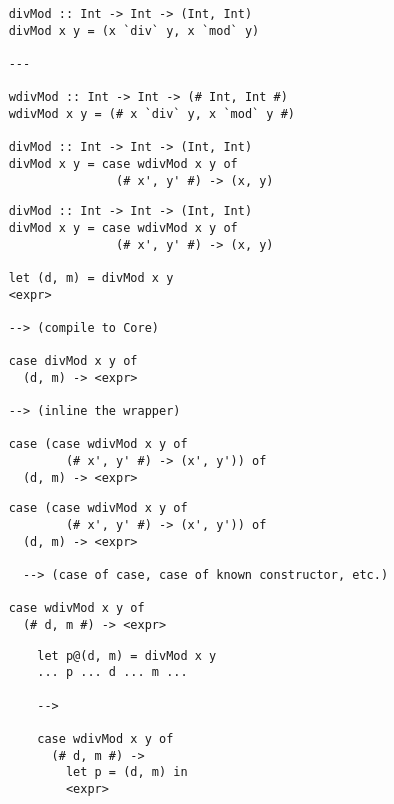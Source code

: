 \documentclass{beamer}
\begin{document}
\begin{frame}[fragile]
    \begin{verbatim}
    divMod :: Int -> Int -> (Int, Int)
    divMod x y = (x `div` y, x `mod` y)

    ---

    wdivMod :: Int -> Int -> (# Int, Int #)
    wdivMod x y = (# x `div` y, x `mod` y #)

    divMod :: Int -> Int -> (Int, Int)
    divMod x y = case wdivMod x y of
                   (# x', y' #) -> (x, y)
    \end{verbatim}
\end{frame}

\begin{frame}[fragile]
    \begin{verbatim}
    divMod :: Int -> Int -> (Int, Int)
    divMod x y = case wdivMod x y of
                   (# x', y' #) -> (x, y)

    let (d, m) = divMod x y
    <expr>

    --> (compile to Core)

    case divMod x y of
      (d, m) -> <expr>

    --> (inline the wrapper)

    case (case wdivMod x y of
            (# x', y' #) -> (x', y')) of
      (d, m) -> <expr>
    \end{verbatim}
\end{frame}

\begin{frame}[fragile]
    \begin{verbatim}
    case (case wdivMod x y of
            (# x', y' #) -> (x', y')) of
      (d, m) -> <expr>

      --> (case of case, case of known constructor, etc.)

    case wdivMod x y of
      (# d, m #) -> <expr>
    \end{verbatim}
\end{frame}

\begin{frame}[fragile]
    \begin{verbatim}
        let p@(d, m) = divMod x y
        ... p ... d ... m ...

        -->

        case wdivMod x y of
          (# d, m #) ->
            let p = (d, m) in
            <expr>
    \end{verbatim}
\end{frame}
\end{document}
